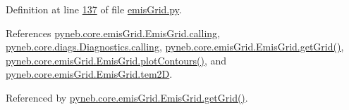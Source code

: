 Definition at line \hyperlink{emis_grid_8py_source_l00137}{137} of file \hyperlink{emis_grid_8py_source}{emis\+Grid.\+py}.



References \hyperlink{emis_grid_8py_source_l00041}{pyneb.\+core.\+emis\+Grid.\+Emis\+Grid.\+calling}, \hyperlink{diags_8py_source_l00169}{pyneb.\+core.\+diags.\+Diagnostics.\+calling}, \hyperlink{emis_grid_8py_source_l00111}{pyneb.\+core.\+emis\+Grid.\+Emis\+Grid.\+get\+Grid()}, \hyperlink{emis_grid_8py_source_l00179}{pyneb.\+core.\+emis\+Grid.\+Emis\+Grid.\+plot\+Contours()}, and \hyperlink{emis_grid_8py_source_l00088}{pyneb.\+core.\+emis\+Grid.\+Emis\+Grid.\+tem2\+D}.



Referenced by \hyperlink{emis_grid_8py_source_l00111}{pyneb.\+core.\+emis\+Grid.\+Emis\+Grid.\+get\+Grid()}.


